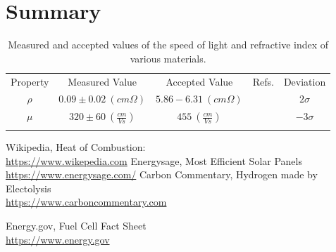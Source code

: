 \documentclass[aps,prl,reprint]{revtex4-2}
\begin{document}
\section{Summary}

\begin{widetext}
\begin{center}
\begin{table}[h]
\renewcommand{\arraystretch}{1.35}
\setlength{\tabcolsep}{10pt}
\caption{\label{rhotable}Measured and accepted values of the speed of light and refractive index of various materials.}
\begin{tabular}{ccccc}
\toprule
Property & Measured Value &  Accepted Value & Refs. &   Deviation \\
\colrule
$\rho$ &    $0.09 \pm 0.02\  (cm\Omega)$ &  $5.86-6.31\ (cm\Omega)$ &  \cite{resistivity} &   $2\sigma$ \\
\colrule
$\mu$ &  $320 \pm 60\  (\frac{cm}{Vs})$ &      $455\ (\frac{cm}{Vs})$ &  \cite{resistivity} &  $-3\sigma$ \\
\botrule
\end{tabular}
\end{table}
\end{center}
\end{widetext}


\begin{thebibliography}{9}
%
Wikipedia, Heat of Combustion: \\
\href{https://en.wikipedia.org/wiki/Heat_of_combustion}{https://www.wikepedia.com}
%
Energysage, Most Efficient Solar Panels\\
\href{https://news.energysage.com/what-are-the-most-efficient-solar-panels-on-the-market/#:~:text=How%20efficient%20are%20solar%20panels,are%20not%20above%2020%25%20efficiency.}{https://www.energysage.com/}
%
Carbon Commentary, Hydrogen made by Electolysis\\
\href{https://www.carboncommentary.com/blog/2017/7/5/hydrogen-made-by-the-electrolysis-of-water-is-now-cost-competitive-and-gives-us-another-building-block-for-the-low-carbon-economy}{https://www.carboncommentary.com}
%

%
Energy.gov, Fuel Cell Fact Sheet\\
\href{https://www.energy.gov/sites/prod/files/2015/11/f27/fcto_fuel_cells_fact_sheet.pdf}{https://www.energy.gov}

\end{thebibliography}
\end{document}
